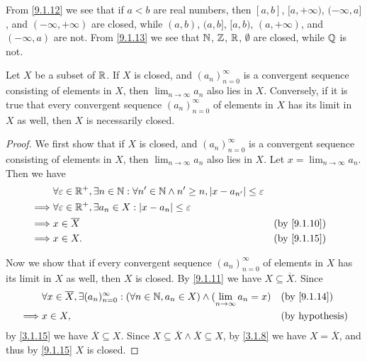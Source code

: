\begin{eg}\label{9.1.16}
  From \cref{9.1.12} we see that if \(a < b\) are real numbers, then \([a, b]\), \([a, +\infty)\), \((-\infty, a]\), and \((-\infty, +\infty)\) are closed, while \((a, b)\), \((a, b]\), \([a, b)\), \((a, +\infty)\), and \((-\infty, a)\) are not.
  From \cref{9.1.13} we see that \(\mathbb{N}\), \(\mathbb{Z}\), \(\mathbb{R}\), \(\emptyset\) are closed, while \(\mathbb{Q}\) is not.
\end{eg}

\begin{cor}\label{9.1.17}
  Let \(X\) be a subset of \(\mathbb{R}\).
  If \(X\) is closed, and \((a_n)_{n = 0}^\infty\) is a convergent sequence consisting of elements in \(X\), then \(\lim_{n \to \infty} a_n\) also lies in \(X\).
  Conversely, if it is true that every convergent sequence \((a_n)_{n = 0}^\infty\) of elements in \(X\) has its limit in \(X\) as well, then \(X\) is necessarily closed.
\end{cor}

\begin{proof}
  We first show that if \(X\) is closed, and \((a_n)_{n = 0}^\infty\) is a convergent sequence consisting of elements in \(X\), then \(\lim_{n \to \infty} a_n\) also lies in \(X\).
  Let \(x = \lim_{n \to \infty} a_n\).
  Then we have
  \begin{align*}
             & \forall \varepsilon \in \R^+, \exists n \in \N : \forall n' \in \N \land n' \geq n, \abs{x - a_{n'}} \leq \varepsilon                  \\
    \implies & \forall \varepsilon \in \R^+, \exists a_n \in X : \abs{x - a_n} \leq \varepsilon                                                       \\
    \implies & x \in \overline{X}                                                                                                    &  & \by{9.1.10} \\
    \implies & x \in X.                                                                                                              &  & \by{9.1.15}
  \end{align*}

  Now we show that if every convergent sequence \((a_n)_{n = 0}^\infty\) of elements in \(X\) has its limit in \(X\) as well, then \(X\) is closed.
  By \cref{9.1.11} we have \(X \subseteq \overline{X}\).
  Since
  \begin{align*}
             & \forall x \in \overline{X}, \exists (a_n)_{n = 0}^\infty : (\forall n \in \N, a_n \in X) \land (\lim_{n \to \infty} a_n = x) &  & \by{9.1.14}            \\
    \implies & x \in X,                                                                                                                     &  & \text{(by hypothesis)}
  \end{align*}
  by \cref{3.1.15} we have \(\overline{X} \subseteq X\).
  Since \(X \subseteq \overline{X} \land \overline{X} \subseteq X\), by \cref{3.1.8} we have \(X = \overline{X}\), and thus by \cref{9.1.15} \(X\) is closed.
\end{proof}

